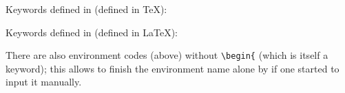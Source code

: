 %
Keywords defined in  (defined in \TeX):
%


Keywords defined in  (defined in \LaTeX):
%


There are also environment codes (above) without \verb|\begin{| (which is itself a keyword); this allows to finish the environment name alone by  if one started to input it manually.

